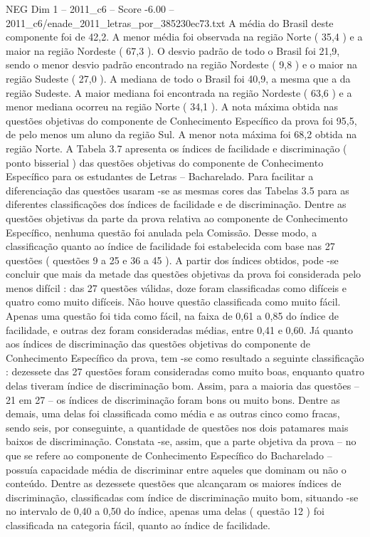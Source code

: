 \begin{textsample}{NEG Dim 1 – 2011\_c6 – Score -6.00 – 2011\_c6/enade\_2011\_letras\_por\_385230ec73.txt}
A média do Brasil deste componente foi de 42,2.
A menor média foi observada na região Norte ( 35,4 ) e a maior na região Nordeste ( 67,3 ).
O desvio padrão de todo o Brasil foi 21,9, sendo o menor desvio padrão encontrado na região Nordeste ( 9,8 ) e o maior na região Sudeste ( 27,0 ).
A mediana de todo o Brasil foi 40,9, a mesma que a da região Sudeste.
A maior mediana foi encontrada na região Nordeste ( 63,6 ) e a menor mediana ocorreu na região Norte ( 34,1 ).
A nota máxima obtida nas questões objetivas do componente de Conhecimento Específico da prova foi 95,5, de pelo menos um aluno da região Sul.
A menor nota máxima foi 68,2 obtida na região Norte.
A Tabela 3.7 apresenta os índices de facilidade e discriminação ( ponto bisserial ) das questões objetivas do componente de Conhecimento Específico para os estudantes de Letras – Bacharelado.
Para facilitar a diferenciação das questões usaram -se as mesmas cores das Tabelas 3.5 para as diferentes classificações dos índices de facilidade e de discriminação.
Dentre as questões objetivas da parte da prova relativa ao componente de Conhecimento Específico, nenhuma questão foi anulada pela Comissão.
Desse modo, a classificação quanto ao índice de facilidade foi estabelecida com base nas 27 questões ( questões 9 a 25 e 36 a 45 ).
A partir dos índices obtidos, pode -se concluir que mais da metade das questões objetivas da prova foi considerada pelo menos difícil : das 27 questões válidas, doze foram classificadas como difíceis e quatro como muito difíceis.
Não houve questão classificada como muito fácil.
Apenas uma questão foi tida como fácil, na faixa de 0,61 a 0,85 do índice de facilidade, e outras dez foram consideradas médias, entre 0,41 e 0,60.
Já quanto aos índices de discriminação das questões objetivas do componente de Conhecimento Específico da prova, tem -se como resultado a seguinte classificação : dezessete das 27 questões foram consideradas como muito boas, enquanto quatro delas tiveram índice de discriminação bom.
Assim, para a maioria das questões – 21 em 27 – os índices de discriminação foram bons ou muito bons.
Dentre as demais, uma delas foi classificada como média e as outras cinco como fracas, sendo seis, por conseguinte, a quantidade de questões nos dois patamares mais baixos de discriminação.
Constata -se, assim, que a parte objetiva da prova – no que se refere ao componente de Conhecimento Específico do Bacharelado – possuía capacidade média de discriminar entre aqueles que dominam ou não o conteúdo.
Dentre as dezessete questões que alcançaram os maiores índices de discriminação, classificadas com índice de discriminação muito bom, situando -se no intervalo de 0,40 a 0,50 do índice, apenas uma delas ( questão 12 ) foi classificada na categoria fácil, quanto ao índice de facilidade.

\end{textsample}
